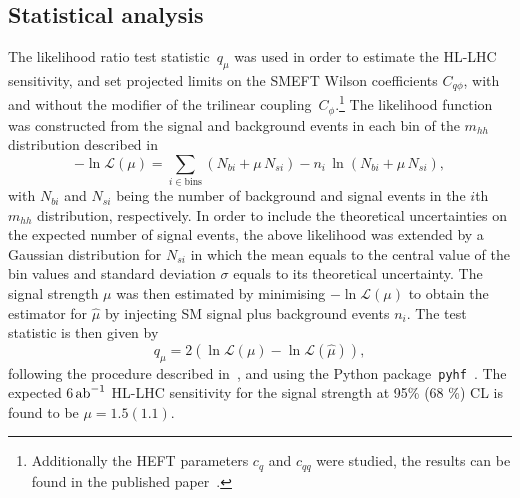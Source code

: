 \subsection{Statistical analysis}
The likelihood ratio test statistic~$q_\mu$ was used  in order to estimate the HL-LHC sensitivity, and set projected limits on the SMEFT Wilson coefficients $C_{q\phi}$, with and without the modifier of the trilinear coupling~$C_\phi$.\footnote{ Additionally the HEFT parameters $c_q$ and $c_{qq}$ were studied, the results can be found in the published paper~\cite{Alasfar:2019pmn}.} The likelihood function was constructed from the signal and background events in each bin of the $m_{hh}$ distribution described in ~\cite{Azatov:2015oxa} 
\begin{equation} \label{loglik}
	- \ln \mathscr L (\mu) = \sum_{i \in \mathrm{bins}} (N_{bi} + \mu\, N_{si}) - n_i\, \ln(N_{bi} + \mu\, N_{si}),
\end{equation}
with  $N_{bi}$ and $N_{si}$ being the number of background  and signal events in the $i$th $ m_{hh}$ distribution, respectively. In order to include the theoretical uncertainties on the expected number of signal events, the above likelihood was extended by a Gaussian distribution for $N_{si}$ in which the mean equals to the central value of the bin values and standard deviation $\sigma$ equals to its theoretical uncertainty.
The signal strength $ \mu$ was then estimated by minimising $- \ln \mathscr L (\mu)$ to obtain the estimator for $\hat \mu$ by injecting SM signal plus background events $n_i$. The test statistic is then given by
\begin{equation}
	q_\mu = 2 (\ln \mathscr L (\mu)- \ln \mathscr L ( \hat \mu) ),
\end{equation}
following the procedure described in~\cite{Cowan:2010js}, and using the Python package~\texttt{pyhf}~\cite{pyhf,pyhf_joss}.
The expected  6$\,{\rm ab}^{-1}$ HL-LHC sensitivity for the signal strength  at 95\% (68 \%) CL is found to be $\mu  = 1.5 (1.1)$.

